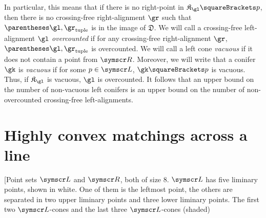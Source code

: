\documentclass[10pt, a4paper, twoside]{basestyle}
\newcommand{\pointset}{\symscr}
\newcommand{\conification}{\mathfrak{K}}
\newcommand{\decomposition}{\mathfrak{D}}
\begin{document}
In particular, this means that if there is no right-point in $\conification_\gl\of{p}$,
then there is no crossing-free right-alignment $\gr$ such that $\tuple{\gl,\gr}$ is in the image of $\decomposition$.
We will call a crossing-free left-alignment $\gl$ \emph{overcounted} if for any crossing-free right-alignment $\gr$,
$\tuple{\gl,\gr}$ is overcounted. We will call a left cone \emph{vacuous} if it does not contain a point
from $\pointset R$. 
Moreover, we will write that a conifer $\gk$ is \emph{vacuous} if for some $p\in\pointset L$,
$\gk\of{p}$ is vacuous. Thus, if $\conification_\gl$ is vacuous, $\gl$ is overcounted.
It follows that an upper bound on the number of non-vacuous left conifers is an upper bound on the number of non-overcounted
crossing-free left-alignments.
\section{Highly convex matchings across a line}
\label{sectionHighlyConvex}
\marginfig[Point sets $\pointset L$ and $\pointset R$, both
of size $8$. $\pointset L$ has five liminary points, shown in
white. One of them is the leftmost point, the others are separated in two
upper liminary points and three lower liminary points.
The first two $\pointset L$-cones and the last three $\pointset L$-cones (shaded)
\end{document}
